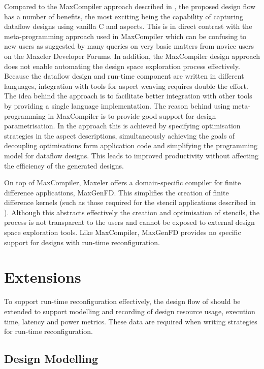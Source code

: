 Compared to the MaxCompiler approach described in
, the proposed design flow has a number of
benefits, the most exciting being the capability of capturing dataflow
designs using vanilla C and aspects. This is in direct contrast with
the meta-programming\cite{metaprogramming} approach used in
MaxCompiler which can be confusing to new users as suggested by many
queries on very basic matters from novice users on the Maxeler
Developer Forums\cite{mdx}. In addition, the MaxCompiler design
approach does not enable automating the design space exploration
process effectively. Because the dataflow design and run-time
component are written in different languages, integration with tools
for aspect weaving requires double the effort. The idea behind the
\FAST{} approach is to facilitate better integration with other tools
by providing a single language implementation. The reason behind using
meta-programming in MaxCompiler is to provide good support for design
parametrisation. In the \FAST{} approach this is achieved by
specifying optimisation strategies in the aspect descriptions,
simultaneously achieving the goals of decoupling optimisations form
application code and simplifying the programming model for dataflow
designs. This leads to improved productivity without affecting the
efficiency of the generated designs.

On top of MaxCompiler, Maxeler offers a domain-specific compiler for
finite difference applications, MaxGenFD\cite{MaxelerFD}. This
simplifies the creation of finite difference kernels (such as those
required for the stencil applications described in
). Although this abstracts effectively the
creation and optimisation of stencils, the process is not transparent
to the users and cannot be exposed to external design space
exploration tools. Like MaxCompiler, MaxGenFD provides no specific
support for designs with run-time reconfiguration.

\section{Extensions}

To support run-time reconfiguration effectively, the design flow of
 should be extended to support modelling and
recording of design resource usage, execution time, latency and power
metrics. These data are required when writing strategies for run-time
reconfiguration.

\subsection{Design Modelling}

